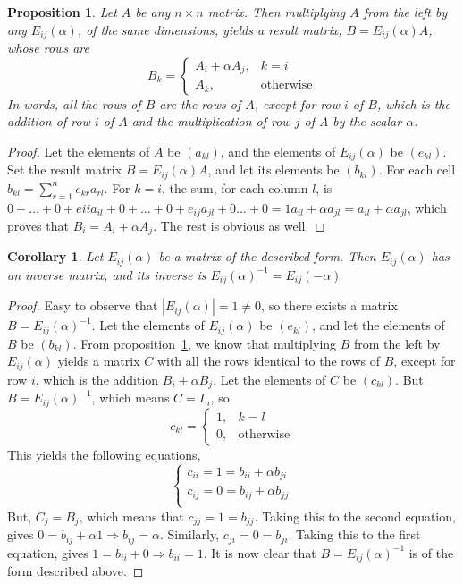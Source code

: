 \documentclass[12pt]{article}
\newtheorem{proposition}[theorem]{Proposition}
\newtheorem{corollary}[theorem]{Corollary}
\begin{document}
\begin{proposition} \label{prop:elem.oper.row.add}
Let $A$ be any $n \times n$ matrix. Then multiplying $A$ from the left by any $E_{ij}(\alpha)$, of the same dimensions, yields a result matrix, $B=E_{ij}(\alpha)A$, whose rows are $$
B_k=\begin{cases}
		A_i+\alpha A_j, & k=i\\
            A_k, & \text{otherwise}
		 \end{cases}
$$
In words, all the rows of $B$ are the rows of $A$, except for row $i$ of $B$, which is the addition of row $i$ of $A$ and the multiplication of row $j$ of A by the scalar $\alpha$.
\end{proposition}
\begin{proof}
Let the elements of $A$ be $(a_{kl})$, and the elements of $E_{ij}(\alpha)$ be $(e_{kl})$. Set the result matrix $B=E_{ij}(\alpha)A$, and let its elements be $(b_{kl})$. For each cell $b_{kl}=\sum_{r=1}^n e_{kr}a_{rl}$. For $k=i$, the sum, for each column $l$, is $0+\dots+0+e{ii}a_{il}+0+\dots+0+e_{ij}a_{jl}+0\dots+0=1a_{il}+\alpha a_{jl}=a_{il}+\alpha a_{jl}$, which proves that $B_i=A_i+\alpha A_j$. The rest is obvious as well.
\end{proof}
\begin{corollary}
\label{cor:inv.elem.oper.row.add}
Let $E_{ij}(\alpha)$ be a matrix of the described form. Then $E_{ij}(\alpha)$ has an inverse matrix, and its inverse is $E_{ij}(\alpha)^{-1}=E_{ij}(-\alpha)$
\end{corollary}
\begin{proof}
Easy to observe that $|E_{ij}(\alpha)|=1\neq 0$, so there exists a matrix $B=E_{ij}(\alpha)^{-1}$. Let the elements of $E_{ij}(\alpha)$ be $(e_{kl})$, and let the elements of $B$ be $(b_{kl})$. From proposition~\ref{prop:elem.oper.row.add}, we know that multiplying $B$ from the left by $E_{ij}(\alpha)$ yields a matrix $C$ with all the rows identical to the rows of $B$, except for row $i$, which is the addition $B_i+\alpha B_j$. Let the elements of $C$ be $(c_{kl})$. But $B=E_{ij}(\alpha)^{-1}$, which means $C=I_n$, so 
$$
c_{kl}=\begin{cases}
		1, & k=l\\
            0, & \text{otherwise}
		 \end{cases}
$$
This yields the following equations,
$$
\begin{cases}
c_{ii}=1=b_{ii}+\alpha b_{ji}\\
c_{ij}=0=b_{ij}+\alpha b_{jj}\\
		 \end{cases}
$$
But, $C_j=B_j$, which means that $c_{jj}=1=b_{jj}$. Taking this to the second equation, gives $0=b_{ij}+\alpha 1 \Rightarrow b_{ij}=\alpha$. Similarly, $c_{ji}=0=b_{ji}$. Taking this to the first equation, gives $1=b_{ii}+0 \Rightarrow b_{ii}=1$. It is now clear that $B=E_{ij}(\alpha)^{-1}$ is of the form described above.
\end{proof}
\end{document}
